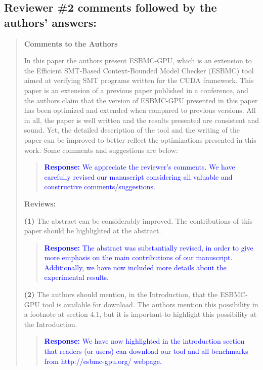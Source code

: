 \documentclass[11pt]{article}
\begin{document}
\subsection*{Reviewer \#2 comments followed by the authors' answers:}
\begin{quote}

{\bf Comments to the Authors}

In this paper the authors present ESBMC-GPU, which is an extension to the Efficient SMT-Based Context-Bounded Model Checker (ESBMC) tool aimed at verifying SMT programs written for the CUDA framework. This paper is an extension of a previous paper published in a conference, and the authors claim that the version of ESBMC-GPU presented in this paper has been optimized and extended when compared to previous versions. All in all, the paper is well written and the results presented are consistent and sound. Yet, the detailed description of the tool and the writing of the paper can be improved to better reflect the optimizations presented in this work. Some comments and suggestions are below:

\begin{quote}
\textcolor{blue}{\textbf{Response:} We appreciate the reviewer's comments. We have carefully revised our manuscript considering all valuable and constructive comments/suggestions.}
\end{quote}

{\bf Reviews:}

{\bf(1)} The abstract can be considerably improved. The contributions of this paper should be highlighted at the abstract.

\begin{quote}
\textcolor{blue}{\textbf{Response:} The abstract was substantially revised, in order to give more emphasis on the main contributions of our manuscript. Additionally, we have now included more details about the experimental results.}
\end{quote}

{\bf(2)} The authors should mention, in the Introduction, that the ESBMC-GPU tool is available for download. The authors mention this possibility in a footnote at section 4.1, but it is important to highlight this possibility at the Introduction.

\begin{quote}
\textcolor{blue}{\textbf{Response:} We have now highlighted in the introduction section that readers (or users) can download our tool and all benchmarks from http://esbmc-gpu.org/ webpage.}
\end{quote}


\end{quote}
\end{document}
